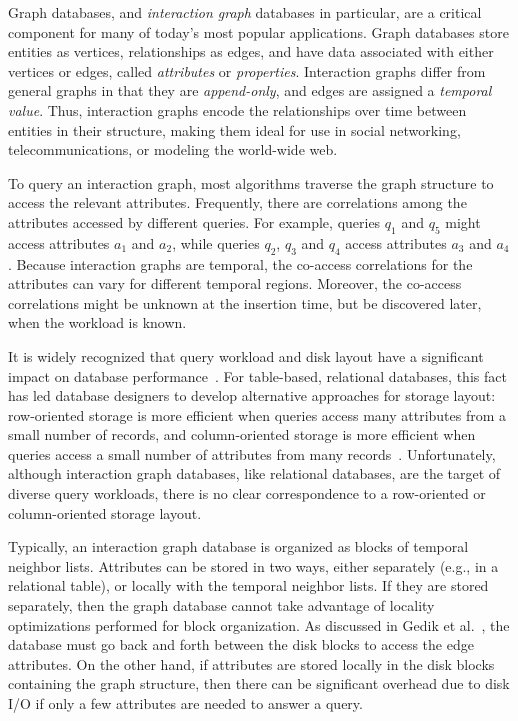 
Graph databases, and \emph{interaction graph} databases in
particular, are a critical component for many of today's most popular
applications.  Graph databases store entities as vertices, relationships as
edges, and have data associated with either vertices or edges, called
\emph{attributes} or \emph{properties}.  Interaction graphs differ from general
graphs in that they are \emph{append-only}, and edges are assigned a
\emph{temporal value}.  Thus, interaction graphs encode the relationships over
time between entities in their structure, making them ideal for use in social
networking, telecommunications, or modeling the world-wide web.

To query an interaction graph, most algorithms traverse the graph structure to
access the relevant attributes.  Frequently, there are correlations among the
attributes accessed by different queries. For example, queries $q_1$ and $q_5$
might access attributes $a_1$ and $a_2$, while queries $q_2$, $q_3$ and $q_4$
access attributes $a_3$ and $a_4$. Because interaction graphs are temporal, the
co-access correlations for the attributes can vary for different
temporal regions.  Moreover, the co-access correlations might be unknown at the
insertion time, but be discovered later, when the workload is known.

It is widely recognized that query workload and disk layout have a significant
impact on database performance~\cite{alagiannis14,grund10,stonebraker05}.  For
table-based, relational databases, this fact has led database designers to
develop alternative approaches for storage layout: row-oriented storage is more
efficient when queries access many attributes from a small number of records,
and column-oriented storage is more efficient when queries access a small number
of attributes from many records~\cite{stonebraker05}.  Unfortunately, although
interaction graph databases, like relational databases, are the target of
diverse query workloads, there is no clear correspondence to a row-oriented or
column-oriented storage layout.

Typically, an interaction graph database is organized as blocks of temporal
neighbor lists.  Attributes can be stored in two ways, either separately (e.g., in a relational
table), or locally with the temporal neighbor lists.  If they are stored
separately, then the graph database cannot take advantage of locality
optimizations performed for block organization.  As discussed in Gedik et
al.~\cite{gedik14}, the database must go back and forth between the disk blocks
to access the edge attributes.  On the other hand, if attributes are stored
locally in the disk blocks containing the graph structure, then there can be
significant overhead due to disk I/O if only a few attributes are needed to
answer a query.

